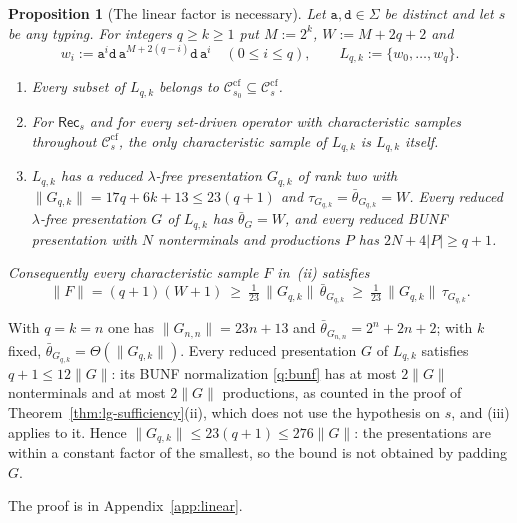 \documentclass[11pt]{article}
\numberwithin{equation}{section}
\theoremstyle{plain}
\newtheorem{proposition}[theorem]{Proposition}
\theoremstyle{definition}
\theoremstyle{remark}
\theoremstyle{plain}
\newcommand{\cf}{\mathrm{cf}}
\newcommand{\Ccf}[1]{\mathcal C_{#1}^{\cf}}
\newcommand{\Rec}{\mathsf{Rec}}
\begin{document}
\begin{proposition}[The linear factor is necessary]
\label{prop:linear-factor}
Let $\mathtt a,\mathtt d\in\Sigma$ be distinct and let $s$ be any
typing.  For integers $q\ge k\ge1$ put $M:=2^k$, $W:=M+2q+2$ and
\[
 w_i:=\mathtt a^i\mathtt d\,\mathtt a^{M+2(q-i)}\mathtt d\,
 \mathtt a^i\quad(0\le i\le q),\qquad L_{q,k}:=\{w_0,\ldots,w_q\}.
\]
\begin{enumerate}[label=\textup{(\roman*)},leftmargin=*]
\item Every subset of $L_{q,k}$ belongs to
$\Ccf{s_0}\subseteq\Ccf{s}$.
\item For $\Rec_s$ and for every set-driven operator with characteristic
samples throughout $\Ccf{s}$, the only characteristic sample of $L_{q,k}$ is
$L_{q,k}$ itself.
\item $L_{q,k}$ has a reduced $\lambda$-free presentation $G_{q,k}$ of rank two with
$\|G_{q,k}\|=17q+6k+13\le23(q+1)$ and $\tau_{G_{q,k}}=\bar\theta_{G_{q,k}}=W$.
Every reduced $\lambda$-free presentation $G$ of $L_{q,k}$ has $\bar\theta_G=W$, and every
reduced BUNF presentation with $N$ nonterminals and productions $P$ has
$2N+4|P|\ge q+1$.
\end{enumerate}
Consequently every characteristic sample $F$ in~\textup{(ii)} satisfies
\[
 \|F\|=(q+1)(W+1)\ \ge\ \tfrac1{23}\,\|G_{q,k}\|\,\bar\theta_{G_{q,k}}
 \ \ge\ \tfrac1{23}\,\|G_{q,k}\|\,\tau_{G_{q,k}}.
\]
\end{proposition}

With $q=k=n$ one has $\|G_{n,n}\|=23n+13$ and $\bar\theta_{G_{n,n}}=2^n+2n+2$;
with $k$ fixed, $\bar\theta_{G_{q,k}}=\Theta(\|G_{q,k}\|)$.  Every reduced presentation $G$ of
$L_{q,k}$ satisfies $q+1\le12\|G\|$: its BUNF normalization \ref{q:bunf} has at
most $2\|G\|$ nonterminals and at most $2\|G\|$ productions, as counted in the
proof of Theorem~\ref{thm:lg-sufficiency}(ii), which does not use the hypothesis
on $s$, and (iii) applies to it.  Hence $\|G_{q,k}\|\le23(q+1)\le276\|G\|$: the
presentations are within a constant factor of the smallest, so the bound is not
obtained by padding $G$.

The proof is in Appendix~\ref{app:linear}.
\end{document}
